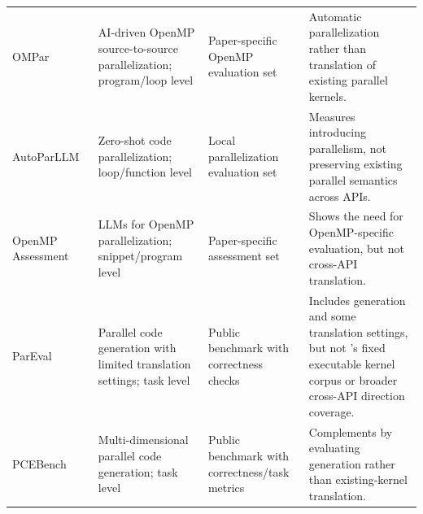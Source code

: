 \begin{table}[p]
\begin{tabularx}{\textwidth}{@{}
>{\RaggedRight\arraybackslash}p{}
>{\RaggedRight\arraybackslash}p{}
>{\RaggedRight\arraybackslash}p{}
>{\RaggedRight\arraybackslash}X
@{}}
OMPar~\cite{OMPar2024}
& AI-driven OpenMP source-to-source parallelization; program/loop level
& Paper-specific OpenMP evaluation set
& Automatic parallelization rather than translation of existing parallel kernels. \\

AutoParLLM~\cite{AutoParLLM2025}
& Zero-shot code parallelization; loop/function level
& Local parallelization evaluation set
& Measures introducing parallelism, not preserving existing parallel semantics across APIs. \\

OpenMP Assessment~\cite{OpenMPAssessment2024}
& LLMs for OpenMP parallelization; snippet/program level
& Paper-specific assessment set
& Shows the need for OpenMP-specific evaluation, but not cross-API translation. \\

ParEval~\cite{ParEval2024}
& Parallel code generation with limited translation settings; task level
& Public benchmark with correctness checks
& Includes generation and some translation settings, but not \parbench{}'s fixed executable kernel corpus or broader cross-API direction coverage. \\

PCEBench~\cite{PCEBench2025}
& Multi-dimensional parallel code generation; task level
& Public benchmark with correctness/task metrics
& Complements \parbench{} by evaluating generation rather than existing-kernel translation. \\

\bottomrule
\end{tabularx}
\end{table}

